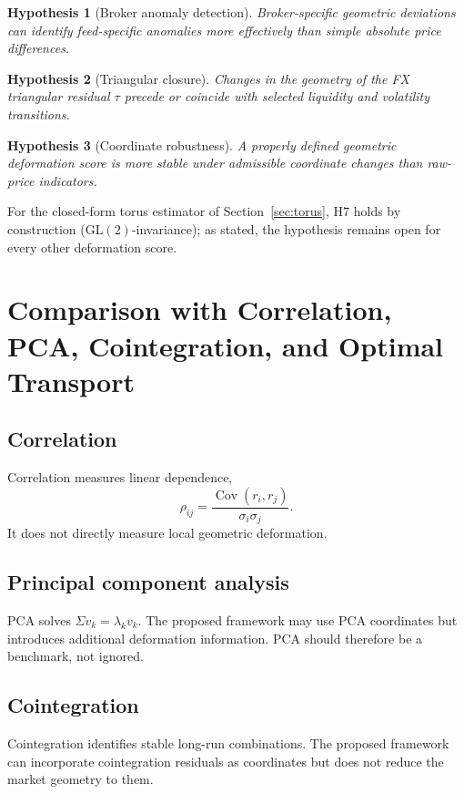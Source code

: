 \documentclass[11pt,a4paper]{article}
\numberwithin{equation}{section}
\newtheorem{hypothesis}{Hypothesis}
\newcommand{\Cov}{\operatorname{Cov}}
\begin{document}
\begin{hypothesis}[Broker anomaly detection]
Broker-specific geometric deviations can identify feed-specific
anomalies more effectively than simple absolute price differences.
\end{hypothesis}

\begin{hypothesis}[Triangular closure]
Changes in the geometry of the FX triangular residual $\tau$ precede
or coincide with selected liquidity and volatility transitions.
\end{hypothesis}

\begin{hypothesis}[Coordinate robustness]
A properly defined geometric deformation score is more stable under
admissible coordinate changes than raw-price indicators.
\end{hypothesis}

For the closed-form torus estimator of Section~\ref{sec:torus}, H7
holds by construction ($\mathrm{GL}(2)$-invariance); as stated, the
hypothesis remains open for every other deformation score.

\section{Comparison with Correlation, PCA, Cointegration, and Optimal Transport}

\subsection{Correlation}
Correlation measures linear dependence,
\[
\rho_{ij}=\frac{\Cov(r_i,r_j)}{\sigma_i\sigma_j}.
\]
It does not directly measure local geometric deformation.

\subsection{Principal component analysis}
PCA solves $\Sigma v_k=\lambda_kv_k$. The proposed framework may use
PCA coordinates but introduces additional deformation information.
PCA should therefore be a benchmark, not ignored.

\subsection{Cointegration}
Cointegration identifies stable long-run combinations. The proposed
framework can incorporate cointegration residuals as coordinates but
does not reduce the market geometry to them.
\end{document}
